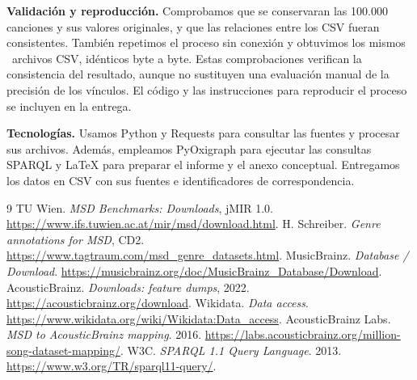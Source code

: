 \documentclass[11pt,a4paper]{article}
\begin{document}
\textbf{Validación y reproducción.} Comprobamos que se conservaran las 100.000 canciones y sus valores originales, y que las relaciones entre los CSV fueran consistentes. También repetimos el proceso sin conexión y obtuvimos los mismos \NumeroTablas\ archivos CSV, idénticos byte a byte. Estas comprobaciones verifican la consistencia del resultado, aunque no sustituyen una evaluación manual de la precisión de los vínculos. El código y las instrucciones para reproducir el proceso se incluyen en la entrega.

\textbf{Tecnologías.} Usamos Python y Requests para consultar las fuentes y procesar sus archivos. Además, empleamos PyOxigraph para ejecutar las consultas SPARQL y LaTeX para preparar el informe y el anexo conceptual. Entregamos los datos en CSV con sus fuentes e identificadores de correspondencia.

\vspace{-3pt}
\begin{thebibliography}{9}\small
\setlength{\itemsep}{1pt}\setlength{\parskip}{0pt}
 TU Wien. \emph{MSD Benchmarks: Downloads}, jMIR 1.0. \url{https://www.ifs.tuwien.ac.at/mir/msd/download.html}.
 H. Schreiber. \emph{Genre annotations for MSD}, CD2. \url{https://www.tagtraum.com/msd_genre_datasets.html}.
 MusicBrainz. \emph{Database / Download}. \url{https://musicbrainz.org/doc/MusicBrainz_Database/Download}.
 AcousticBrainz. \emph{Downloads: feature dumps}, 2022. \url{https://acousticbrainz.org/download}.
 Wikidata. \emph{Data access}. \url{https://www.wikidata.org/wiki/Wikidata:Data_access}.
 AcousticBrainz Labs. \emph{MSD to AcousticBrainz mapping}. 2016. \url{https://labs.acousticbrainz.org/million-song-dataset-mapping/}.
 W3C. \emph{SPARQL 1.1 Query Language}. 2013. \url{https://www.w3.org/TR/sparql11-query/}.
\end{thebibliography}
\end{document}
